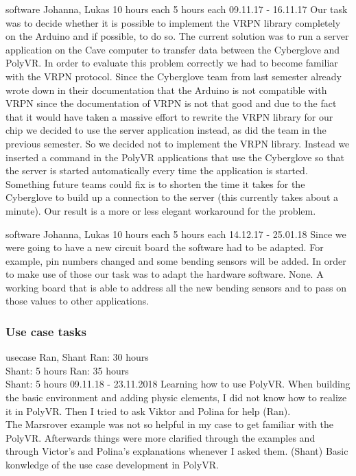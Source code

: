 	{software}%
	{Johanna, Lukas}%
	{10 hours each}%
	{5 hours each}%
	{09.11.17 - 16.11.17}%
	{Our task was to decide whether it is possible to implement the VRPN library completely on the Arduino and if possible, to do so. The current solution was to run a server application on the Cave computer to transfer data between the Cyberglove and PolyVR. In order to evaluate this problem correctly we had to become familiar with the VRPN protocol.}%
	{Since the Cyberglove team from last semester already wrote down in their documentation that the Arduino is not compatible with VRPN since the documentation of VRPN is not that good and due to the fact that it would have taken a massive effort to rewrite the VRPN library for our chip we decided to use the server application instead, as did the team in the previous semester. So we decided not to implement the VRPN library. Instead we inserted a command in the PolyVR applications that use the Cyberglove so that the server is started automatically every time the application is started. Something future teams could fix is to shorten the time it takes for the Cyberglove to build up a connection to the server (this currently takes about a minute).}%
	{Our result is a more or less elegant workaround for the problem.}%
	
	
	{software}%
	{Johanna, Lukas} %
	{10 hours each}%
	{5 hours each}%
	{14.12.17 - 25.01.18}%
	{Since we were going to have a new circuit board the software had to be adapted. For example, pin numbers changed and some bending sensors will be added. In order to make use of those our task was to adapt the hardware software.}%
	{None.}%
	{A working board that is able to address all the new bending sensors and to pass on those values to other applications.}%
	
	
\subsubsection{Use case tasks}

	{usecase}%
	{Ran, Shant} %
	{Ran: 30 hours \\
	 Shant: 5 hours } %
	{Ran: 35 hours \\
	 Shant: 5 hours} %
	{09.11.18 - 23.11.2018} %
	{Learning how to use PolyVR.}%
	{When building the basic environment and adding physic elements, I did not know how to realize it in PolyVR. Then I tried to ask Viktor and Polina for help (Ran). \\ 
	The Marsrover example was not so helpful in my case to get familiar with the PolyVR. Afterwards things were more clarified through  the examples and through Victor's and Polina's explanations whenever I asked them. (Shant)}%
	{Basic konwledge of the use case development in PolyVR.}%

